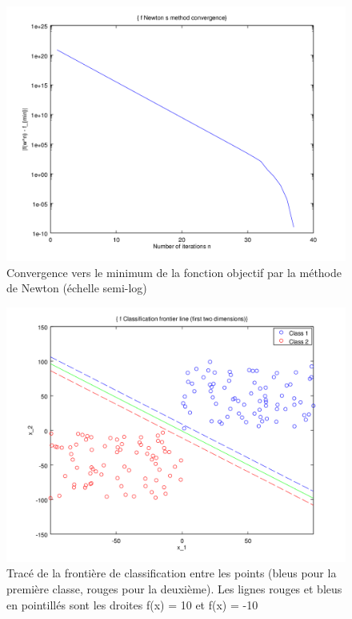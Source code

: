 \documentclass{article}
\begin{document}
         \begin{figure}
           \begin{center}
             \includegraphics[scale=0.5]{images/cvnewton2.png}
             \caption{Convergence vers le minimum de la fonction objectif par la méthode de Newton (échelle semi-log)}
           \end{center}
         \end{figure}

         \begin{figure}
           \begin{center}
             \includegraphics[scale=0.5]{images/line2.png}
             \caption{Tracé de la frontière de classification entre les points (bleus pour la première classe, rouges pour la deuxième). Les lignes rouges et bleus en pointillés sont les droites f(x) = 10 et f(x) = -10}
           \end{center}
         \end{figure}
\end{document}
